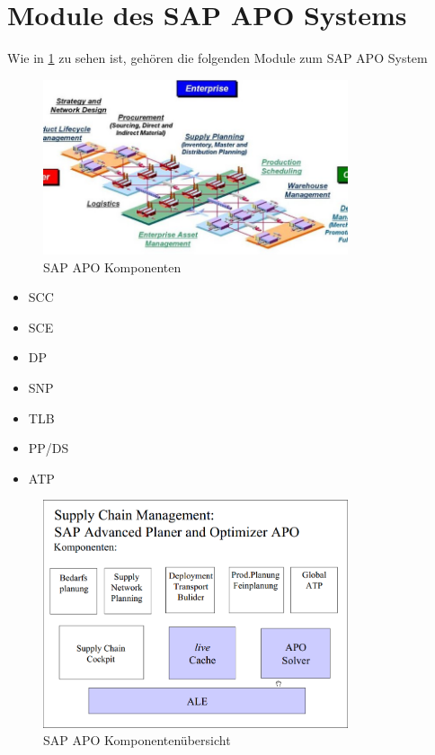 \section{Module des SAP APO Systems}
Wie in \ref{fig:scm_komponent} zu sehen ist, gehören die folgenden Module zum SAP \ac{APO} System \cite[Abschnitt 4, Seite 6]{scm:script_17_1}
\begin{figure}[h]
	\centering
	\includegraphics[width=0.8\textwidth]{../pics/scm_komponent}
	\caption{SAP APO Komponenten \cite{scm:grafik_scm_module_12}}
	\label{fig:scm_komponent}
\end{figure}

\begin{itemize}
	\item \ac{SCC}
	\item \ac{SCE}
	\item \ac{DP}
	\item \ac{SNP}
	\item \ac{TLB}
	\item \ac{PP/DS}
	\item \ac{ATP}
\end{itemize}

\begin{figure}[h]
	\centering
	\includegraphics[width=0.8\textwidth]{../pics/scm_script_planungsmodi_APO-Module_nko}
	\caption{SAP APO Komponentenübersicht \cite[Abschnitt 4, Seite 6]{scm:script_17_1}}
	\label{fig:sap_apo_komp}
\end{figure}

